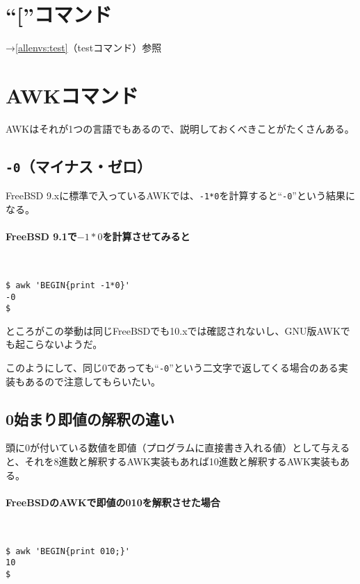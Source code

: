 \section{``[''コマンド}

\noindent
→\ref{allenvs:test}（testコマンド）参照

\section{AWKコマンド}
\label{allenvs:AWK}

AWKはそれが1つの言語でもあるので、説明しておくべきことがたくさんある。

\subsection*{\verb|-0|（マイナス・ゼロ）}

FreeBSD 9.xに標準で入っているAWKでは、\verb|-1*0|を計算すると``\verb|-0|''という結果になる。

\paragraph{FreeBSD 9.1で$-1*0$を計算させてみると}　\\
\begin{screen}
	\verb|$ awk 'BEGIN{print -1*0}'| \return \\
	\verb|-0| \\
	\verb|$ |
\end{screen}

ところがこの挙動は同じFreeBSDでも10.xでは確認されないし、GNU版AWKでも起こらないようだ。

このようにして、同じ0であっても``\verb|-0|''という二文字で返してくる場合のある実装もあるので注意してもらいたい。

\subsection*{0始まり即値の解釈の違い}

頭に0が付いている数値を即値（プログラムに直接書き入れる値）として与えると、それを8進数と解釈するAWK実装もあれば10進数と解釈するAWK実装もある。

\paragraph{FreeBSDのAWKで即値の010を解釈させた場合}　\\
\begin{screen}
	\verb|$ awk 'BEGIN{print 010;}'| \return \\
	\verb|10| \\
	\verb|$ |
\end{screen}

